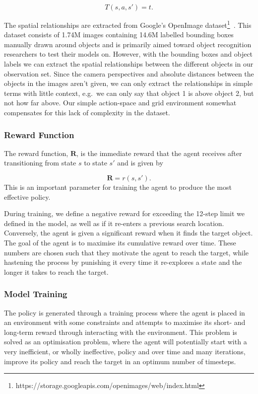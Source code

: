 \documentclass[a4paper, twoside]{article}
\begin{document}
\begin{equation}
  T(s, a, s') = t.
\end{equation}

The spatial relationships are extracted from Google's OpenImage dataset\footnote{https://storage.googleapis.com/openimages/web/index.html}~\cite{openimages}. This dataset consists of 1.74M images containing 14.6M labelled bounding boxes manually drawn around objects and is primarily aimed toward object recognition researchers to test their models on. However, with the bounding boxes and object labels we can extract the spatial relationships between the different objects in our observation set. Since the camera perspectives and absolute distances between the objects in the images aren't given, we can only extract the relationships in simple terms with little context, e.g.\ we can only say that object 1 is above object 2, but not how far above. Our simple action-space and grid environment somewhat compensates for this lack of complexity in the dataset. 

\subsubsection{Reward Function}

\noindent The reward function, $\mathbf{R}$, is the immediate reward that the agent receives after transitioning from state $s$ to state $s'$ and is given by 

\begin{equation}
  \mathbf{R} = r(s, s').
\end{equation} 
This is an important parameter for training the agent to produce the most effective policy. 

During training, we define a negative reward for exceeding the 12-step limit we defined in the model, as well as if it re-enters a previous search location. Conversely, the agent is given a significant reward when it finds the target object. The goal of the agent is to maximise its cumulative reward over time. These numbers are chosen such that they motivate the agent to reach the target, while hastening the process by punishing it every time it re-explores a state and the longer it takes to reach the target. 

\subsubsection{Model Training}

\noindent The policy is generated through a training process where the agent is placed in an environment with some constraints and attempts to maximise its short- and long-term reward through interacting with the environment. This problem is solved as an optimisation problem, where the agent will potentially start with a very inefficient, or wholly ineffective, policy and over time and many iterations, improve its policy and reach the target in an optimum number of timesteps. 
\end{document}
